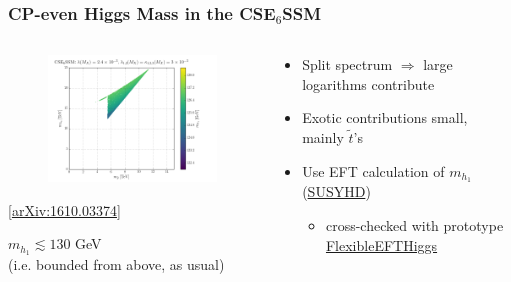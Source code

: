 \documentclass[10pt,aspectratio=169]{beamer}
\begin{document}
\begin{frame}
  \frametitle{CP-even Higgs Mass in the CSE$_6$SSM}
  \begin{columns}[t]
    \begin{column}{0.4\textwidth}
      \vspace{-20pt}
      \begin{figure}
        \hspace*{-15pt}
        \includegraphics[width=7.5cm]{cse6ssm_pos_mueff_1TeV_MSu6_MGlu_Mhh1}
      \end{figure}
      \vspace{-20pt}
      \begin{center}
        \tiny [\href{https://arxiv.org/abs/1610.03374}{arXiv:1610.03374}]
      \end{center}
      \begin{center}
        $m_{h_1} \lesssim 130$ GeV\\(i.e. bounded from above, as usual)
      \end{center}
    \end{column}
    \begin{column}{0.6\textwidth}
      \vspace{-20pt}
      \begin{itemize}
        \vfill
      \item {\color{red} Split spectrum $\Rightarrow$ large logarithms
        contribute}
          \vfill
        \item Exotic contributions small, mainly $\tilde{t}$'s
          \vfill
        \item Use EFT calculation of $m_{h_1}$
          (\href{http://users.ictp.it/susyhd/}{SUSYHD})
          \begin{itemize}
          \item cross-checked with prototype
            \href{http://flexiblesusy.hepforge.org/}{FlexibleEFTHiggs}
          \end{itemize}
          \vfill
      \end{itemize}

\end{column}
\end{columns}
\end{frame}
\end{document}
